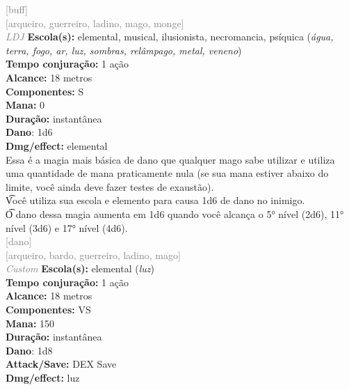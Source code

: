 \documentclass{RPG_Adventure}[2021/10/20]
\begin{document}
{\scriptsize \textcolor{gray}{[buff]\\}}
{\scriptsize \textcolor{gray}{[arqueiro, guerreiro, ladino, mago, monge]\\}}
{\tiny \textcolor{gray}{\textit{LDJ}}}\jump{}
{\small \t \textbf{Escola(s):} elemental, musical, ilusionista, necromancia, psíquica (\textit{água, terra, fogo, ar, luz, sombras, relâmpago, metal, veneno})\\\t \textbf{Tempo conjuração:} 1 ação\\\t \textbf{Alcance:} 18 metros\\\t \textbf{Componentes:} S\\\t \textbf{Mana:} 0\\\t \textbf{Duração:} instantânea\\\t \textbf{Dano}: 1d6\\\t \textbf{Dmg/effect:} elemental\\}
{\normalsize Essa é a magia mais básica de dano que qualquer mago sabe utilizar e utiliza uma quantidade de mana praticamente nula (se sua mana estiver abaixo do limite, você ainda deve fazer testes de exaustão).\\\t Você utiliza sua escola e elemento para causa 1d6 de dano no inimigo.\\\t O dano dessa magia aumenta em 1d6 quando você alcança o 5° nível (2d6), 11° nível (3d6) e 17° nível (4d6).\\}
{\scriptsize \textcolor{gray}{[dano]\\}}
{\scriptsize \textcolor{gray}{[arqueiro, bardo, guerreiro, ladino, mago]\\}}
{\tiny \textcolor{gray}{\textit{Custom}}}\jump{}
{\small \t \textbf{Escola(s):} elemental (\textit{luz})\\\t \textbf{Tempo conjuração:} 1 ação\\\t \textbf{Alcance:} 18 metros\\\t \textbf{Componentes:} VS\\\t \textbf{Mana:} 150\\\t \textbf{Duração:} instantânea\\\t \textbf{Dano}: 1d8\\\t \textbf{Attack/Save:} DEX Save\\\t \textbf{Dmg/effect:} luz\\}
\end{document}
